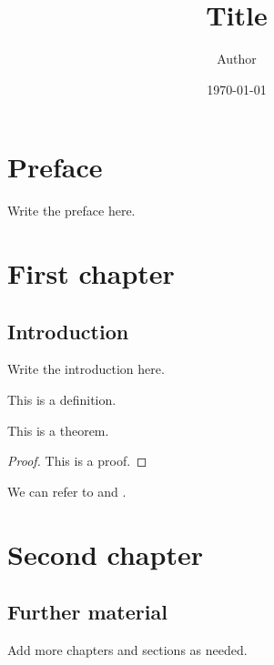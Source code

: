 \documentclass[12pt,a4paper]{amsbook}
\title[Short title]{Title}
\author[Author]{Author}
\date{\today}
\begin{document}
\frontmatter

\maketitle

\tableofcontents

\chapter*{Preface}

Write the preface here.

\mainmatter

\chapter{First chapter}

\section{Introduction}

Write the introduction here.

\begin{definition}\label{definition:sample}
This is a definition.
\end{definition}

\begin{theorem}\label{theorem:sample}
This is a theorem.
\end{theorem}

\begin{proof}
This is a proof.
\end{proof}

We can refer to  and .

\chapter{Second chapter}

\section{Further material}

Add more chapters and sections as needed.

\backmatter

\printbibliography
\end{document}
